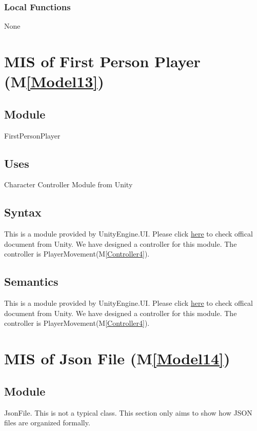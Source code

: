 \documentclass[12pt, titlepage]{article}
\newcommand{\mref}[1]{M\ref{#1}}
\begin{document}
\subsubsection{Local Functions}
None

\newpage

\section{MIS of First Person Player (\mref{Model13})}

\subsection{Module}
FirstPersonPlayer

\subsection{Uses}
Character Controller Module from Unity

\subsection{Syntax}
This is a module provided by UnityEngine.UI. Please click
\href{https://docs.unity3d.com/ScriptReference/CharacterController.html}{here} to check offical document from Unity. We have 
designed a controller for this module. The controller is 
PlayerMovement(\mref{Controller4}).
\subsection{Semantics}
This is a module provided by UnityEngine.UI. Please click
\href{https://docs.unity3d.com/ScriptReference/CharacterController.html}{here} to check offical document from Unity. We have 
designed a controller for this module. The controller is 
PlayerMovement(\mref{Controller4}).


\newpage

\section{MIS of Json File (\mref{Model14})}

\subsection{Module}
JsonFile. This is not a typical class. This section only aims
to show how JSON files are organized formally.
\end{document}
